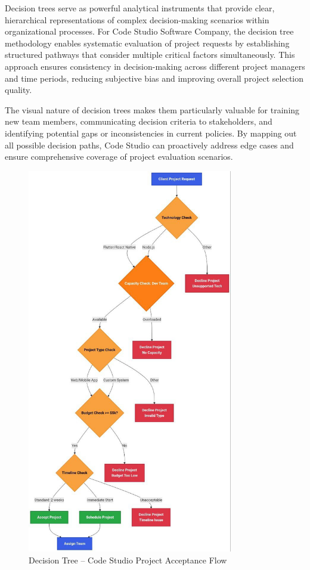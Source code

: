 \documentclass[12pt,a4paper]{article}
\begin{document}
Decision trees serve as powerful analytical instruments that provide clear, hierarchical representations of complex decision-making scenarios within organizational processes. For Code Studio Software Company, the decision tree methodology enables systematic evaluation of project requests by establishing structured pathways that consider multiple critical factors simultaneously. This approach ensures consistency in decision-making across different project managers and time periods, reducing subjective bias and improving overall project selection quality.

The visual nature of decision trees makes them particularly valuable for training new team members, communicating decision criteria to stakeholders, and identifying potential gaps or inconsistencies in current policies. By mapping out all possible decision paths, Code Studio can proactively address edge cases and ensure comprehensive coverage of project evaluation scenarios.

\begin{figure}[H]
\centering
\includegraphics[width=0.8\textwidth]{dt.jpeg}
\caption{Decision Tree – Code Studio Project Acceptance Flow}
\end{figure}
\end{document}
